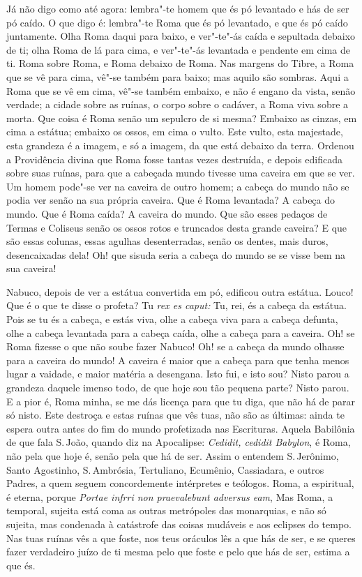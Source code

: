 Já não digo como até agora: lembra"-te homem que és pó levantado e hás de
ser pó caído. O que digo é: lembra"-te Roma que és pó levantado, e que és
pó caído juntamente. Olha Roma daqui para baixo, e ver"-te"-ás caída e
sepultada debaixo de ti; olha Roma de lá para cima, e ver"-te"-ás
levantada e pendente em cima de ti. Roma sobre Roma, e Roma debaixo de
Roma. Nas margens do Tibre, a Roma que se vê para cima, vê"-se também
para baixo; mas aquilo são sombras. Aqui a Roma que se vê em cima, vê"-se
também embaixo, e não é engano da vista, senão verdade; a cidade sobre as
ruínas, o corpo sobre o cadáver, a Roma viva sobre a morta. Que coisa é
Roma senão um sepulcro de si mesma? Embaixo as cinzas, em cima a
estátua; embaixo os ossos, em cima o vulto. Este vulto, esta majestade,
esta grandeza é a imagem, e só a imagem, da que está debaixo da terra.
Ordenou a Providência divina que Roma fosse tantas vezes destruída, e
depois edificada sobre suas ruínas, para que a cabeçada mundo tivesse
uma caveira em que se ver. Um homem pode"-se ver na caveira de outro
homem; a cabeça do mundo não se podia ver senão na sua própria caveira.
Que é Roma levantada? A cabeça do mundo. Que é Roma caída? A caveira do
mundo. Que são esses pedaços de Termas e Coliseus senão os ossos rotos e
truncados desta grande caveira? E que são essas colunas, essas agulhas
desenterradas, senão os dentes, mais duros, desencaixadas dela! Oh! que
sisuda seria a cabeça do mundo se se visse bem na sua caveira!

Nabuco, depois de ver a estátua convertida em pó, edificou outra
estátua. Louco! Que é o que te disse o profeta? Tu \emph{rex es caput:}
Tu, rei, és a cabeça da estátua. Pois se tu és a cabeça, %
e estás viva, olhe a cabeça viva para a cabeça defunta, olhe a cabeça
levantada para a cabeça caída, olhe a cabeça para a caveira. Oh! se Roma
fizesse o que não soube fazer Nabuco! Oh! se a cabeça da mundo olhasse
para a caveira do mundo! A caveira é maior que a cabeça para que tenha
menos lugar a vaidade, e maior matéria a desengana. Isto fui, e isto
sou? Nisto parou a grandeza daquele imenso todo, de que hoje sou tão
pequena parte? Nisto parou. E a pior é, Roma minha, se me dás licença
para que tu diga, que não há de parar só nisto. Este destroça e estas
ruínas que vês tuas, não são as últimas: ainda te espera outra antes do
fim do mundo profetizada nas Escrituras. Aquela Babilônia de que fala S.\,João, quando diz na Apocalipse: \emph{Cedidit, cedidit Babylon}, %
é Roma, não pela que hoje é, senão pela que há de ser. Assim o
entendem S.\,Jerônimo, Santo Agostinho, S.\,Ambrósia, Tertuliano,
Ecumênio, Cassiadara, e outros Padres, a quem seguem concordemente
intérpretes e teólogos. Roma, a espiritual, é eterna, porque
\emph{Portae infrri non praevalebunt adversus eam}, Mas Roma, a
temporal, sujeita está coma as outras metrópoles das monarquias, e não
só sujeita, mas condenada à catástrofe das coisas mudáveis e aos eclipses
do tempo. Nas tuas ruínas vês a que foste, nos teus oráculos lês a que
hás de ser, e se queres fazer verdadeiro juízo de ti mesma pelo que
foste e pelo que hás de ser, estima a que és.

